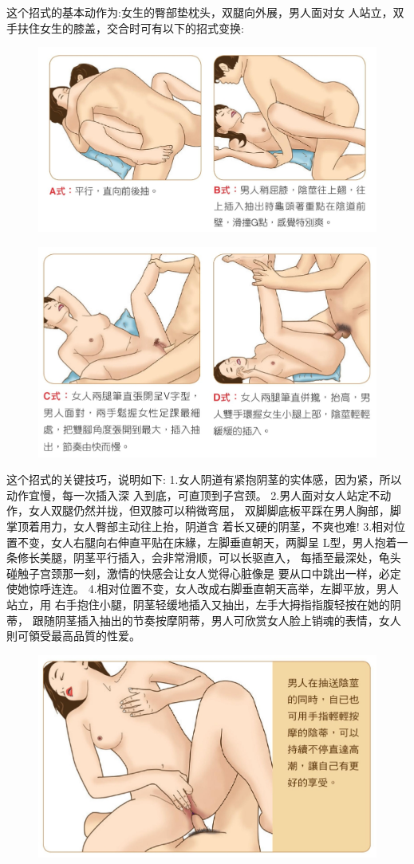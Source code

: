 \documentclass[12pt,UTF8]{ctexbook}
\begin{document}
这个招式的基本动作为:女生的臀部垫枕头，双腿向外展，男人面对女
人站立，双手扶住女生的膝盖，交合时可有以下的招式变换:

\begin{figure}[htbp]
	\centering
	\includegraphics[width=0.7\linewidth]{29}
	\caption{}
	\label{fig:1}
\end{figure}

\begin{figure}[htbp]
	\centering
	\includegraphics[width=0.7\linewidth]{30}
	\caption{}
	\label{fig:1}
\end{figure}

这个招式的关键技巧，说明如下:
1.女人阴道有紧抱阴茎的实体感，因为紧，所以动作宜慢，每一次插入深
入到底，可直顶到子宫颈。
2.男人面对女人站定不动作，女人双腿仍然并拢，但双膝可以稍微弯屈，
双脚脚底板平踩在男人胸部，脚掌顶着用力，女人臀部主动往上抬，阴道含
着长又硬的阴茎，不爽也难!
3.相对位置不变，女人右腿向右伸直平贴在床緣，左脚垂直朝天，两脚呈
L型，男人抱着一条修长美腿，阴茎平行插入，会非常滑顺，可以长驱直入，
每插至最深处，龟头碰触子宫颈那一刻，激情的快感会让女人觉得心脏像是
要从口中跳出一样，必定使她惊呼连连。
4.相对位置不变，女人改成右脚垂直朝天高举，左脚平放，男人站立，用
右手抱住小腿，阴茎轻缓地插入又抽出，左手大拇指指腹轻按在她的阴蒂，
跟随阴茎插入抽出的节奏按摩阴蒂，男人可欣赏女人脸上销魂的表情，女人
則可領受最高品質的性爱。

\begin{figure}[htbp]
	\centering
	\includegraphics[width=0.7\linewidth]{31}
	\caption{}
	\label{fig:1}
\end{figure}
\end{document}
